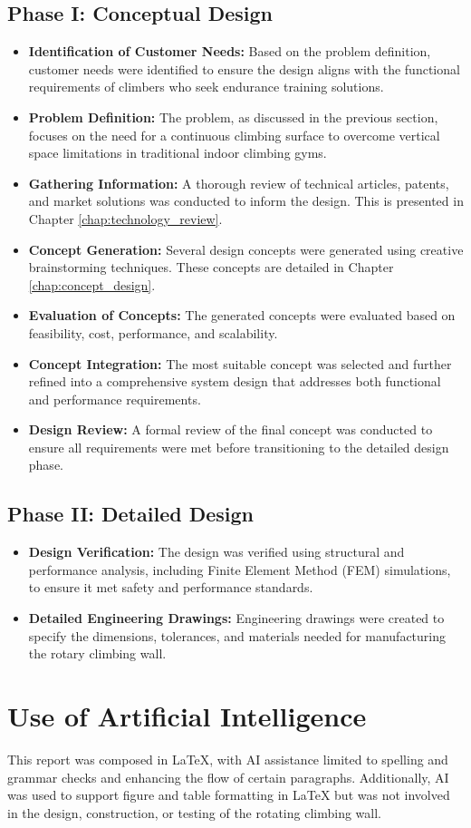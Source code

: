 \subsection{Phase I: Conceptual Design}
\begin{itemize}
    \item \textbf{Identification of Customer Needs:} Based on the problem definition, customer needs were identified to ensure the design aligns with the functional requirements of climbers who seek endurance training solutions.
    \item \textbf{Problem Definition:} The problem, as discussed in the previous section, focuses on the need for a continuous climbing surface to overcome vertical space limitations in traditional indoor climbing gyms.
    \item \textbf{Gathering Information:} A thorough review of technical articles, patents, and market solutions was conducted to inform the design. This is presented in Chapter \ref{chap:technology_review}.
    \item \textbf{Concept Generation:} Several design concepts were generated using creative brainstorming techniques. These concepts are detailed in Chapter \ref{chap:concept_design}.
    \item \textbf{Evaluation of Concepts:} The generated concepts were evaluated based on feasibility, cost, performance, and scalability.
    \item \textbf{Concept Integration:} The most suitable concept was selected and further refined into a comprehensive system design that addresses both functional and performance requirements.
    \item \textbf{Design Review:} A formal review of the final concept was conducted to ensure all requirements were met before transitioning to the detailed design phase.
\end{itemize}

\subsection{Phase II: Detailed Design}
\begin{itemize}
    \item \textbf{Design Verification:} The design was verified using structural and performance analysis, including Finite Element Method (FEM) simulations, to ensure it met safety and performance standards.
    \item \textbf{Detailed Engineering Drawings:} Engineering drawings were created to specify the dimensions, tolerances, and materials needed for manufacturing the rotary climbing wall.
\end{itemize}

\section{Use of Artificial Intelligence}
This report was composed in LaTeX, with AI assistance limited to spelling and grammar checks and enhancing the flow of certain paragraphs. Additionally, AI was used to support figure and table formatting in LaTeX but was not involved in the design, construction, or testing of the rotating climbing wall.

